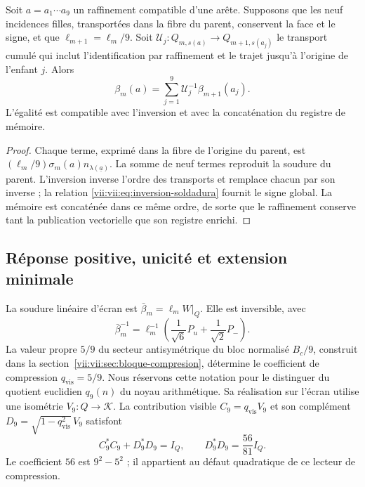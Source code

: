 \begin{proposition}
\label{vii:vii:prop:refinamiento-soldadura}
Soit \(a=a_1\cdots a_9\) un raffinement compatible d'une arête.
Supposons que les neuf incidences filles, transportées dans la fibre du
parent, conservent la face et le signe, et que
\(\ell_{m+1}=\ell_m/9\). Soit
\(\mathcal U_j:Q_{m,s(a)}\longrightarrow Q_{m+1,s(a_j)}\)
le transport cumulé qui inclut l'identification par raffinement
et le trajet jusqu'à l'origine de l'enfant \(j\). Alors
\[
 \beta_m(a)=
 \sum_{j=1}^{9}\mathcal U_j^{-1}\beta_{m+1}(a_j).
\]
L'égalité est compatible avec l'inversion et avec la concaténation du registre de mémoire.
\end{proposition}

\begin{proof}
Chaque terme, exprimé dans la fibre de l'origine du parent, est
\((\ell_m/9)\sigma_m(a)n_{\lambda(\underline a)}\).
La somme de neuf termes reproduit la soudure du parent.
L'inversion inverse l'ordre des transports et remplace chacun
par son inverse ; la relation \eqref{vii:vii:eq:inversion-soldadura} fournit
le signe global. La mémoire est concaténée dans ce même ordre, de sorte
que le raffinement conserve tant la publication vectorielle que son
registre enrichi.
\end{proof}

\subsection{Réponse positive, unicité et extension minimale}
\label{vii:vii:sec:respuesta-positiva}

La soudure linéaire d'écran est \(\bar\beta_m=\ell_mW|_Q\). Elle est inversible, avec
\[
 \bar\beta_m^{-1}
 =\ell_m^{-1}\left(\frac1{\sqrt6}P_u+\frac1{\sqrt2}P_-\right).
\]
La valeur propre \(5/9\) du secteur antisymétrique du bloc normalisé \(B_c/9\), construit dans la section~\ref{vii:vii:sec:bloque-compresion}, détermine le coefficient de compression \(q_{\mathrm{vis}}=5/9\). Nous réservons cette notation pour le distinguer du quotient euclidien \(q_9(n)\) du noyau arithmétique. Sa réalisation sur l'écran utilise une isométrie \(V_9:Q\longrightarrow\mathcal K\). La contribution visible \(C_9=q_{\mathrm{vis}}V_9\) et son complément \(D_9=\sqrt{1-q_{\mathrm{vis}}^2}\,V_9\) satisfont
\[
 C_9^*C_9+D_9^*D_9=I_Q,\qquad D_9^*D_9=\frac{56}{81}I_Q.
\]
Le coefficient \(56\) est \(9^2-5^2\) ; il appartient au défaut quadratique
de ce lecteur de compression.

